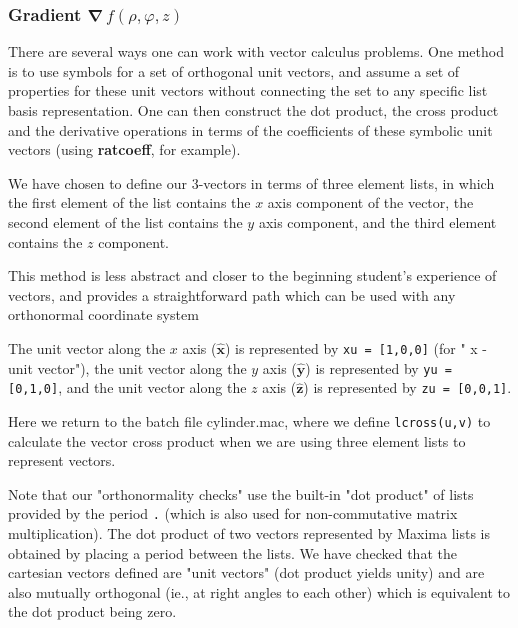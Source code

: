 \documentclass[12pt]{article}
\begin{document}
\subsubsection{Gradient \quad $\boldsymbol{\nabla} \, f(\rho,\varphi,z)$ }
There are several ways one can work with vector calculus problems.
One method is to use symbols for a set of orthogonal unit vectors, and
  assume a set of properties for these unit vectors without connecting
  the set to any specific list basis representation.
One can then construct the dot product, the cross product and the derivative operations
 in terms of the coefficients of these symbolic unit vectors (using \textbf{ratcoeff}, for example).
 
 
\smallskip
We have chosen to define our 3-vectors in terms of three element lists,
 in which the first element of the list contains the $x$ axis component of
 the vector, the second element of the list contains the $y$ axis component,
   and the third element contains the $z$ component.
   
\smallskip
This method is less abstract and closer to the beginning student's experience of
  vectors, and provides a straightforward path which can be used with any 
  orthonormal coordinate system
  
  
\smallskip
The unit vector along the $x$ axis ($\mathbf{\hat{x}}$) is represented by 
  \verb|xu = [1,0,0]| (for " x - unit vector"), the unit vector along the $y$ axis
  ($\mathbf{\hat{y}}$) is represented by \verb|yu = [0,1,0]|, and the unit vector along the
  $z$ axis ($\mathbf{\hat{z}}$) is represented by \verb|zu = [0,0,1]|.
 

 \smallskip
Here we return to the batch file cylinder.mac, where we define \verb|lcross(u,v)|
  to calculate the vector cross product when we are using three element lists
  to represent vectors.

\smallskip
Note that our "orthonormality checks" use the built-in "dot product" of
  lists provided by the period \verb|.| (which is also used for non-commutative
  matrix multiplication). 
The dot product of two vectors represented by Maxima lists is obtained by placing a 
  period between the lists.
We have checked that the cartesian vectors defined are "unit vectors" (dot product yields unity)
  and are also mutually orthogonal (ie., at right angles to each other) which is 
  equivalent to the dot product being zero.
  
\smallskip
  
\end{document}
